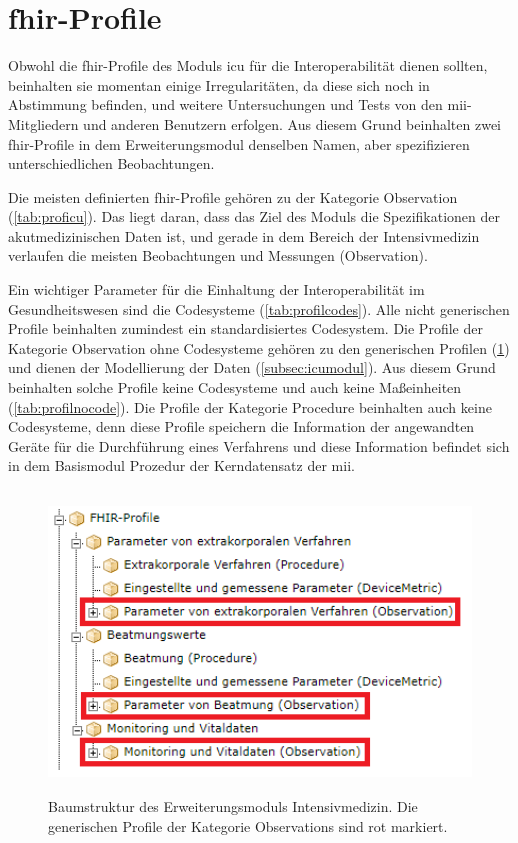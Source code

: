 \section{\acs{fhir}-Profile} \label{sec:fhiricudisc}

Obwohl die \ac{fhir}-Profile des Moduls \glqq\ac{icu}\grqq{} für die Interoperabilität dienen sollten, beinhalten sie momentan einige Irregularitäten, da diese sich noch in Abstimmung befinden, und weitere Untersuchungen und Tests von den \ac{mii}-Mitgliedern und anderen Benutzern erfolgen. Aus diesem Grund beinhalten zwei \ac{fhir}-Profile in dem Erweiterungsmodul denselben Namen, aber spezifizieren unterschiedlichen Beobachtungen.

Die meisten definierten \ac{fhir}-Profile gehören zu der Kategorie \glqq Observation\grqq{} (\ref{tab:proficu}). Das liegt daran, dass das Ziel des Moduls die Spezifikationen der akutmedizinischen Daten ist, und gerade in dem Bereich der Intensivmedizin verlaufen die meisten Beobachtungen und Messungen (\glqq Observation\grqq{}).

Ein wichtiger Parameter für die Einhaltung der Interoperabilität im Gesundheitswesen sind die Codesysteme (\ref{tab:profilcodes}). Alle nicht generischen Profile beinhalten zumindest ein standardisiertes Codesystem. Die Profile der Kategorie \glqq Observation\grqq{} ohne Codesysteme gehören zu den generischen Profilen (\ref{fig:icutreegenerics}) und dienen der Modellierung der Daten (\ref{subsec:icumodul}). Aus diesem Grund beinhalten solche Profile keine Codesysteme und auch keine Maßeinheiten (\ref{tab:profilnocode}). Die Profile der Kategorie \glqq Procedure\grqq{} beinhalten auch keine Codesysteme, denn diese Profile speichern die Information der angewandten Geräte für die Durchführung eines Verfahrens und diese Information befindet sich in dem Basismodul \glqq Prozedur\grqq{} der Kerndatensatz der \ac{mii}.

\begin{figure}[ht]
	\centering
	\includegraphics[height=8cm]{figures/icu_modul_tree_generics}
	\caption[Generische \glqq Observations\grqq{}]{Baumstruktur des Erweiterungsmoduls \glqq Intensivmedizin\grqq{}. Die generischen Profile der Kategorie \glqq Observations\grqq{} sind rot markiert.}
	\label{fig:icutreegenerics}
\end{figure}

